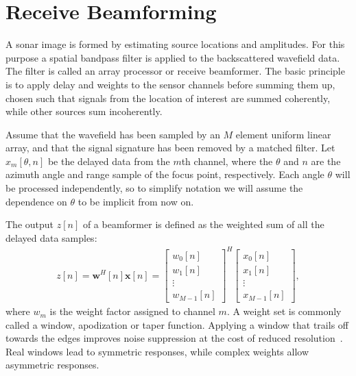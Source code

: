 \documentclass[10pt,journal,draftclsnofoot,onecolumn]{IEEEtran}
\newcommand\bmat[1]{\begin{bmatrix}#1\end{bmatrix}}
\renewcommand\H{^{\scriptscriptstyle H}}
\renewcommand\vec[1]{\boldsymbol{#1}}
\newcommand\1{\vec 1}
\newcommand*\w{\vec w}
\newcommand*\x{\vec x}
\begin{document}
% 
% 


\section{Receive Beamforming}\label{sec:beamforming}

A sonar image is formed by estimating source locations and amplitudes. For this purpose a spatial bandpass filter is applied to the backscattered wavefield data. The filter is called an array processor or receive beamformer. The basic principle is to apply delay and weights to the sensor channels before summing them up, chosen such that signals from the location of interest are summed coherently, while other sources sum incoherently.

Assume that the wavefield has been sampled by an $M$ element uniform linear array, and that the signal signature has been removed by a matched filter. Let $x_m[\theta,n]$ be the delayed data from the $m$th channel, where the $\theta$ and $n$ are the azimuth angle and range sample of the focus point, respectively. Each angle $\theta$ will be processed independently, so to simplify notation we will assume the dependence on $\theta$ to be implicit from now on. 

The output $z[n]$ of a beamformer is defined as the weighted sum of all the delayed data samples:
%
\begin{align}
z[n] = \w\H[n]\x[n] = \bmat{w_0[n]\\w_1[n]\\\vdots\\w_{M-1}[n]}^H \bmat{x_0[n]\\x_1[n]\\\vdots\\x_{M-1}[n]},\label{eq:beamformer_output}
\end{align}
%
where $w_m$ is the weight factor assigned to channel $m$. A weight set is commonly called a window, apodization or taper function. Applying a window that trails off towards the edges improves noise suppression at the cost of reduced resolution~\cite{Harris1978}. Real windows lead to symmetric responses, while complex weights allow asymmetric responses.
\end{document}
